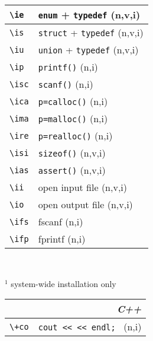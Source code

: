 \documentclass[oneside,11pt,landscape,DIV17]{scrartcl}
\begin{document}
\begin{multicols}{3}
\begin{center}
\begin{tabular}[]{|p{11mm}|p{60mm}|}
\hline \verb'\ie'  & \verb'enum'   + \verb'typedef'   \hfill (n,v,i)\\
\hline \verb'\is'  & \verb'struct' + \verb'typedef'   \hfill (n,v,i)\\
\hline \verb'\iu'  & \verb'union'  + \verb'typedef'   \hfill (n,v,i)\\
\hline \verb'\ip'  & \verb'printf()'                  \hfill (n,i)\\
\hline \verb'\isc' & \verb'scanf()'                   \hfill (n,i)\\
\hline \verb'\ica' & \verb'p=calloc()'                \hfill (n,i)\\
\hline \verb'\ima' & \verb'p=malloc()'                \hfill (n,i)\\
\hline \verb'\ire' & \verb'p=realloc()'               \hfill (n,i)\\
\hline \verb'\isi' & \verb'sizeof()'                  \hfill (n,v,i)\\
\hline \verb'\ias' & \verb'assert()'                  \hfill (n,v,i)\\
\hline \verb'\ii'  & open input file                  \hfill (n,v,i)\\
\hline \verb'\io'  & open output file                 \hfill (n,v,i)\\
\hline \verb'\ifs' & fscanf                           \hfill (n,i)\\
\hline \verb'\ifp' & fprintf                          \hfill (n,i)\\
\hline
\end{tabular}\\
%
\begin{minipage}[b]{64mm}%
\scriptsize{%
\vspace{1mm}
$^1$ {system-wide installation only}\\
}%
\end{minipage}
%
%
%
\begin{tabular}[]{|p{12mm}|p{60mm}|}
\hline 
\multicolumn{2}{|r|}{\textsl{C\textbf{++}}} \\
\hline \verb'\+co'  & \verb'cout << << endl; '                \hfill (n,i)\\

\end{tabular}
\end{center}
\end{multicols}
\end{document}
